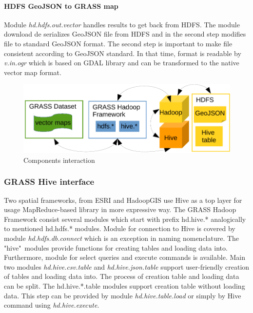 \documentclass[a4paper,12pt,oneside]{report}
\begin{document}
	
	
    \paragraph{HDFS GeoJSON to GRASS map}
    Module \textit{hd.hdfs.out.vector} handles results to get back from HDFS.
    The module download de serializes GeoJSON file from HDFS and in the second step
    modifies file to standard GeoJSON format. The second step is important to make
    file consistent according to GeoJSON standard. In that time, format is readable
    by \textit{v.in.ogr} which is based on GDAL library and can be transformed
    to the native vector map format.
    \begin{figure}[!htbp]
    	\centering
    	\includegraphics[width=1\textwidth]{./img/ghf_overview.pdf}
    	\caption[Components interaction]{\centering Components interaction}
    \end{figure} 
    \subsubsection{GRASS Hive interface}
    Two spatial frameworks, from ESRI and HadoopGIS use Hive as a top layer for
    usage MapReduce-based library in more expressive way. The GRASS Hadoop Framework
    consist several modules which start with prefix hd.hive.* analogically to mentioned
    hd.hdfs.* modules. Module for connection to Hive is covered by module
    \textit{hd.hdfs.db.connect} which is an exception in naming nomenclature. The
    "hive"~modules provide functions for creating tables and loading data into.
    Furthermore, module for select queries and execute commands is available. Main
    two modules \textit{hd.hive.csv.table} and \textit{hd.hive.json.table} support 
    user-friendly creation of tables and loading data into. The process of creation table
    and loading data can be split. The hd.hive.*.table modules support creation table
    without loading data. This step can be provided by module \textit{hd.hive.table.load} or
    simply by Hive command using \textit{hd.hive.execute}.
    
\end{document}
